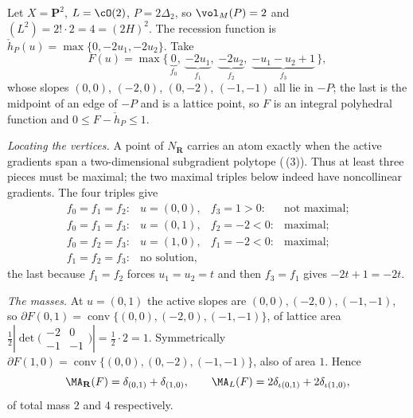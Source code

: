\begin{example}
\label{ex:ch31-toric-p2-two-atoms}
Let $X=\mathbf P^2$, $L=\cO(2)$, $P=2\Delta_2$, so
$\vol_M(P)=2$ and $(L^2)=2!\cdot2=4=(2H)^2$.  The recession function is
$\check h_P(u)=\max\{0,-2u_1,-2u_2\}$.  Take
\[
 F(u)=\max\{\,\underbrace{0}_{f_0},\;
             \underbrace{-2u_1}_{f_1},\;
             \underbrace{-2u_2}_{f_2},\;
             \underbrace{-u_1-u_2+1}_{f_3}\,\},
\]
whose slopes $(0,0)$, $(-2,0)$, $(0,-2)$, $(-1,-1)$ all lie in
$-P$; the last is the midpoint of an edge of $-P$ and is a lattice
point, so $F$ is an integral polyhedral function and
$0\leq F-\check h_P\leq1$.

\emph{Locating the vertices.}  A point of $N_\mathbf R$ carries an atom
exactly when the active gradients span a two-dimensional subgradient
polytope (\,(3)).  Thus at least
three pieces must be maximal; the two maximal triples below indeed have
noncollinear gradients.  The four
triples give
\[
 \begin{array}{llll}
 f_0=f_1=f_2:&u=(0,0),&f_3=1>0:&\text{not maximal};\\
 f_0=f_1=f_3:&u=(0,1),&f_2=-2<0:&\text{maximal};\\
 f_0=f_2=f_3:&u=(1,0),&f_1=-2<0:&\text{maximal};\\
 f_1=f_2=f_3:&\text{no solution},&&
 \end{array}
\]
the last because $f_1=f_2$ forces $u_1=u_2=t$ and then $f_3=f_1$
gives $-2t+1=-2t$.

\emph{The masses.}  At $u=(0,1)$ the active slopes are
$(0,0),(-2,0),(-1,-1)$, so
$\partial F(0,1)=\operatorname{conv}\{(0,0),(-2,0),(-1,-1)\}$, of lattice
area $\tfrac12|{\det}\bigl(\begin{smallmatrix}-2&0\\-1&-1\end{smallmatrix}\bigr)|
 =\tfrac12\cdot2=1$.  Symmetrically
$\partial F(1,0)=\operatorname{conv}\{(0,0),(0,-2),(-1,-1)\}$, also of
area $1$.  Hence
\begin{equation}
\label{eq:ch31-p2-two-atoms}
 \MA_{\mathbf R}(F)=\delta_{(0,1)}+\delta_{(1,0)},
 \qquad
 \MA_L(F)=2\delta_{\iota(0,1)}+2\delta_{\iota(1,0)},
\end{equation}
of total mass $2$ and $4$ respectively.


\end{example}
